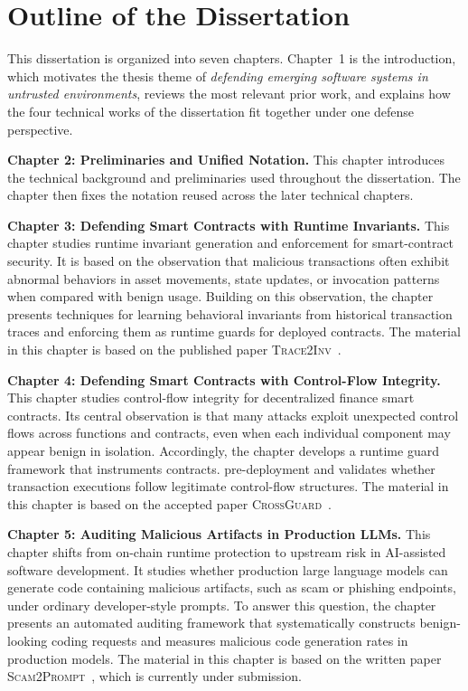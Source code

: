 \section{Outline of the Dissertation}

This dissertation is organized into seven chapters.
Chapter~1 is the introduction, which motivates the thesis theme of
\emph{defending emerging software systems in untrusted environments},
reviews the most relevant prior work,
and explains how the four technical works of the dissertation fit together
under one defense perspective.

\noindent \textbf{Chapter 2: Preliminaries and Unified Notation.}
This chapter introduces the technical background and preliminaries 
used throughout the dissertation.
The chapter then fixes the notation reused across the later technical chapters.

\noindent \textbf{Chapter 3: Defending Smart Contracts with Runtime Invariants.}
This chapter studies runtime invariant generation and enforcement for smart-contract security.
It is based on the observation that malicious transactions often exhibit abnormal behaviors
in asset movements, state updates, or invocation patterns when compared with benign usage.
Building on this observation, the chapter presents techniques for learning behavioral invariants
from historical transaction traces and enforcing them as runtime guards for deployed contracts.
The material in this chapter is based on the published paper
\textsc{Trace2Inv}~\cite{chen2024demystifying}.

\noindent \textbf{Chapter 4: Defending Smart Contracts with Control-Flow Integrity.}
This chapter studies control-flow integrity for decentralized finance smart contracts.
Its central observation is that many attacks exploit unexpected control flows
across functions and contracts, even when each individual component may appear benign in isolation.
Accordingly, the chapter develops a runtime guard framework that instruments contracts. pre-deployment
and validates whether transaction executions follow legitimate control-flow structures.
The material in this chapter is based on the accepted paper
\textsc{CrossGuard}~\cite{chen2025secure}.

\noindent \textbf{Chapter 5: Auditing Malicious Artifacts in Production LLMs.}
This chapter shifts from on-chain runtime protection to upstream risk in AI-assisted software development.
It studies whether production large language models can generate code containing malicious artifacts,
such as scam or phishing endpoints, under ordinary developer-style prompts.
To answer this question, the chapter presents an automated auditing framework
that systematically constructs benign-looking coding requests and measures malicious code generation rates
in production models.
The material in this chapter is based on the written paper
\textsc{Scam2Prompt}~\cite{chen2025scam2prompt}, which is currently under submission.

